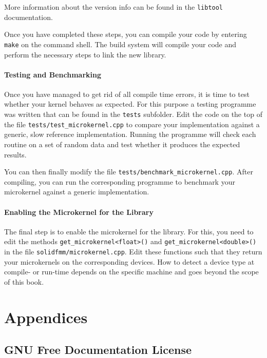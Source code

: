 \documentclass{scrbook}
\begin{document}
More information about the version info can be found in the \lstinline|libtool|
documentation.

Once you have completed these steps, you can compile your code by entering
\lstinline|make| on the command shell. The build system will compile your
code and perform the necessary steps to link the new library.

\subsection{Testing and Benchmarking}
Once you have managed to get rid of all compile time errors, it is time to test
whether your kernel behaves as expected. For this purpose a testing programme
was written that can be found in the \lstinline|tests| subfolder. Edit the
code on the top of the file \lstinline|tests/test_microkernel.cpp| to compare
your implementation against a generic, slow reference implementation. Running
the programme will check each routine on a set of random data and test whether
it produces the expected results. 

You can then finally modify the file
\lstinline|tests/benchmark_microkernel.cpp|. After compiling, you can run the
corresponding programme to benchmark your microkernel against a generic
implementation.

\subsection{Enabling the Microkernel for the Library}
The final step is to enable the microkernel for the library. For this, you need
to edit the methods \lstinline[style=cpp]|get_microkernel<float>()| and
\lstinline[style=cpp]|get_microkernel<double>()| in the file
\lstinline|solidfmm/microkernel.cpp|. Edit these functions such that they return
your microkernels on the corresponding devices. How to detect a device type at
compile- or run-time depends on the specific machine and goes beyond the scope
of this book.

\appendix
\part*{Appendices}

\chapter{GNU Free Documentation License}
\label{chp:gnufdl}
\end{document}
